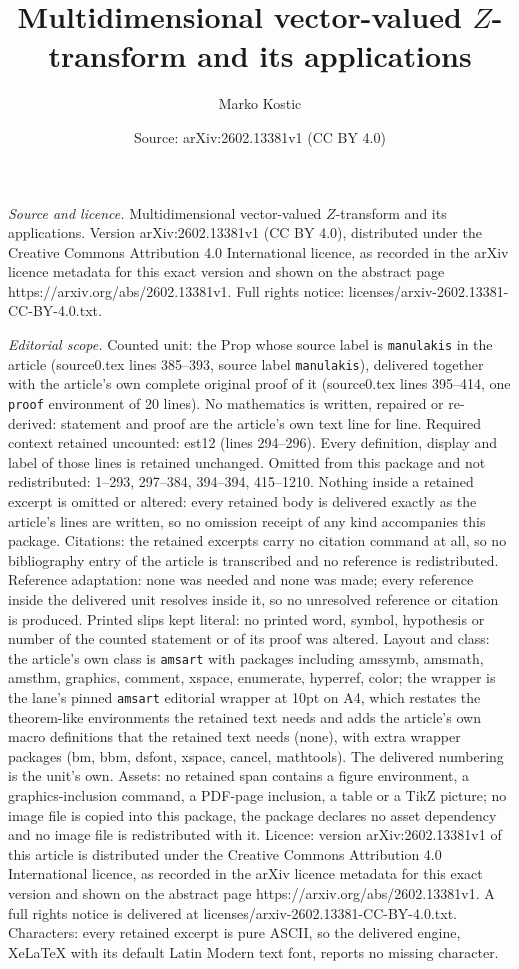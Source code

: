 \documentclass[10pt,a4paper]{amsart}
\title[Multidimensional vector-valued $Z$-transform and its applica]{Multidimensional vector-valued $Z$-transform and its applications}
\author{Marko Kostic}
\date{Source: arXiv:2602.13381v1 (CC BY 4.0)}
\begin{document}
\maketitle

\noindent\emph{Source and licence.} Multidimensional vector-valued $Z$-transform and its applications. Version arXiv:2602.13381v1 (CC BY 4.0), distributed under the Creative Commons Attribution 4.0 International licence, as recorded in the arXiv licence metadata for this exact version and shown on the abstract page https://arxiv.org/abs/2602.13381v1. Full rights notice: licenses/arxiv-2602.13381-CC-BY-4.0.txt.\par\smallskip

\noindent\textit{Editorial scope.} Counted unit: the Prop whose source label is \texttt{manulakis} in the article (source0.tex lines 385--393, source label \texttt{manulakis}), delivered together with the article's own complete original proof of it (source0.tex lines 395--414, one \texttt{proof} environment of 20 lines). No mathematics is written, repaired or re-derived: statement and proof are the article's own text line for line. Required context retained uncounted: est12 (lines 294--296). Every definition, display and label of those lines is retained unchanged. Omitted from this package and not redistributed: 1--293, 297--384, 394--394, 415--1210. Nothing inside a retained excerpt is omitted or altered: every retained body is delivered exactly as the article's lines are written, so no omission receipt of any kind accompanies this package. Citations: the retained excerpts carry no citation command at all, so no bibliography entry of the article is transcribed and no reference is redistributed. Reference adaptation: none was needed and none was made; every reference inside the delivered unit resolves inside it, so no unresolved reference or citation is produced. Printed slips kept literal: no printed word, symbol, hypothesis or number of the counted statement or of its proof was altered. Layout and class: the article's own class is \texttt{amsart} with packages including amssymb, amsmath, amsthm, graphics, comment, xspace, enumerate, hyperref, color; the wrapper is the lane's pinned \texttt{amsart} editorial wrapper at 10pt on A4, which restates the theorem-like environments the retained text needs and adds the article's own macro definitions that the retained text needs (none), with extra wrapper packages (bm, bbm, dsfont, xspace, cancel, mathtools). The delivered numbering is the unit's own. Assets: no retained span contains a figure environment, a graphics-inclusion command, a PDF-page inclusion, a table or a TikZ picture; no image file is copied into this package, the package declares no asset dependency and no image file is redistributed with it. Licence: version arXiv:2602.13381v1 of this article is distributed under the Creative Commons Attribution 4.0 International licence, as recorded in the arXiv licence metadata for this exact version and shown on the abstract page https://arxiv.org/abs/2602.13381v1. A full rights notice is delivered at licenses/arxiv-2602.13381-CC-BY-4.0.txt. Characters: every retained excerpt is pure ASCII, so the delivered engine, XeLaTeX with its default Latin Modern text font, reports no missing character.
\end{document}
